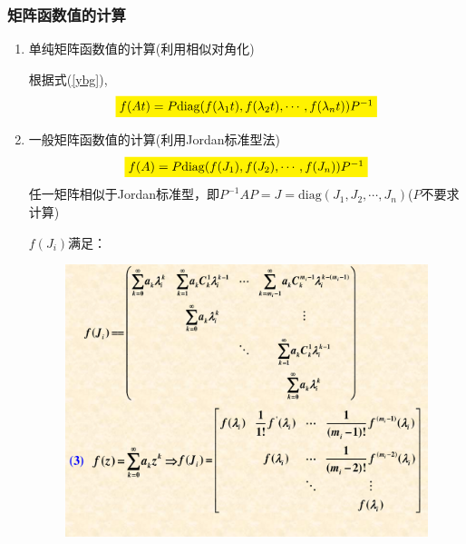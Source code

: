 \subsubsection{矩阵函数值的计算}
\begin{enumerate}
\item 单纯矩阵函数值的计算(利用相似对角化)

根据式(\ref{ybg}),
\[
\colorbox{yellow}{$f(At)=P\mathrm{diag}(f(\lambda_1t),f(\lambda_2t),\cdots,f(\lambda_nt))P^{-1}$}
\]

\item 一般矩阵函数值的计算(利用Jordan标准型法)
\[
\colorbox{yellow}{$f(A)=P\mathrm{diag}(f(J_1),f(J_2),\cdots,f(J_n))P^{-1}$}
\]
任一矩阵相似于Jordan标准型，即$P^{-1}AP=J=\mathrm{diag}(J_1,J_2,\cdots,J_n)$($P$不要求计算)

$f(J_i)$满足：

\begin{figure}[H]
	\small
	\centering 
	\includegraphics[scale=0.7]{image/52.pdf}  
	\label{fi}  
\end{figure}

\end{enumerate}

